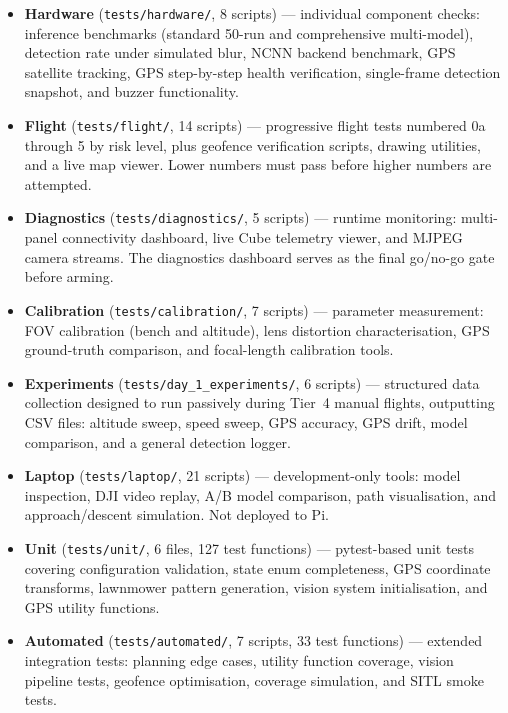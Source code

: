 \begin{itemize}
    \item \textbf{Hardware} (\texttt{tests/hardware/}, 8 scripts) --- individual component checks: inference benchmarks (standard 50-run and comprehensive multi-model), detection rate under simulated blur, NCNN backend benchmark, GPS satellite tracking, GPS step-by-step health verification, single-frame detection snapshot, and buzzer functionality.
    \item \textbf{Flight} (\texttt{tests/flight/}, 14 scripts) --- progressive flight tests numbered 0a through 5 by risk level, plus geofence verification scripts, drawing utilities, and a live map viewer. Lower numbers must pass before higher numbers are attempted.
    \item \textbf{Diagnostics} (\texttt{tests/diagnostics/}, 5 scripts) --- runtime monitoring: multi-panel connectivity dashboard, live Cube telemetry viewer, and MJPEG camera streams. The diagnostics dashboard serves as the final go/no-go gate before arming.
    \item \textbf{Calibration} (\texttt{tests/calibration/}, 7 scripts) --- parameter measurement: FOV calibration (bench and altitude), lens distortion characterisation, GPS ground-truth comparison, and focal-length calibration tools.
    \item \textbf{Experiments} (\texttt{tests/day\_1\_experiments/}, 6 scripts) --- structured data collection designed to run passively during Tier~4 manual flights, outputting CSV files: altitude sweep, speed sweep, GPS accuracy, GPS drift, model comparison, and a general detection logger.
    \item \textbf{Laptop} (\texttt{tests/laptop/}, 21 scripts) --- development-only tools: model inspection, DJI video replay, A/B model comparison, path visualisation, and approach/descent simulation. Not deployed to Pi.
    \item \textbf{Unit} (\texttt{tests/unit/}, 6 files, 127 test functions) --- pytest-based unit tests covering configuration validation, state enum completeness, GPS coordinate transforms, lawnmower pattern generation, vision system initialisation, and GPS utility functions.
    \item \textbf{Automated} (\texttt{tests/automated/}, 7 scripts, 33 test functions) --- extended integration tests: planning edge cases, utility function coverage, vision pipeline tests, geofence optimisation, coverage simulation, and SITL smoke tests.
\end{itemize}

